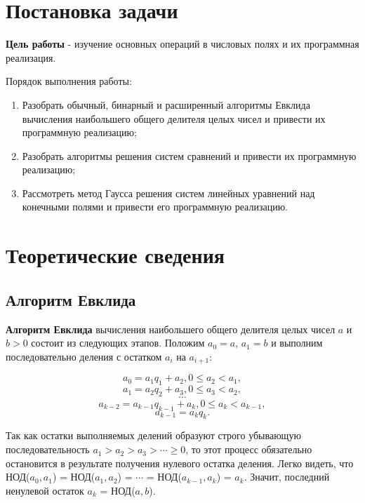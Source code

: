 \documentclass[bachelor, och, labwork]{shiza}
\begin{document}

\section{Постановка задачи}

    \textbf{Цель работы} - изучение основных операций в числовых полях и их
    программная реализация. 

    Порядок выполнения работы:
    \begin{enumerate}
        \item Разобрать обычный, бинарный и расширенный алгоритмы Евклида
        вычисления наибольшего общего делителя целых чисел и привести их
        программную реализацию;
        \item Разобрать алгоритмы решения систем сравнений и привести их
        программную реализацию;
        \item Рассмотреть метод Гаусса решения систем линейных уравнений над
        конечными полями и привести его программную реализацию.
    \end{enumerate}

\section{Теоретические сведения}

    \subsection{Алгоритм Евклида}

        \textbf{Алгоритм Евклида} вычисления наибольшего общего делителя целых
        чисел $a$ и $b
        > 0$ состоит из следующих этапов. Положим $a_0 = a$, $a_1 = b$ и выполним
        последовательно деления с остатком $a_i$ на $a_{i + 1}$:

        $$a_0 = a_1q_1 + a_2, 0 \leq a_2 < a_1,$$
        $$a_1 = a_2q_2 + a_3, 0 \leq a_3 < a_2,$$
        $$\cdots$$
        $$a_{k - 2} = a_{k - 1}q_{k - 1} + a_k, 0 \leq a_k < a_{k - 1},$$
        $$a_{k - 1} = a_k q_k.$$

        Так как остатки выполняемых делений образуют строго убывающую
        последовательность $a_1 > a_2 > a_3 > \cdots \geq 0$, то этот процесс
        обязательно остановится в результате получения нулевого остатка деления.
        Легко видеть, что НОД($a_0, a_1$) = НОД($a_1, a_2$) = $\cdots$ =
        НОД($a_{k-1}, a_k$) = $a_k$. Значит, последний ненулевой остаток $a_k$ =
        НОД($a,b$).
\end{document}
